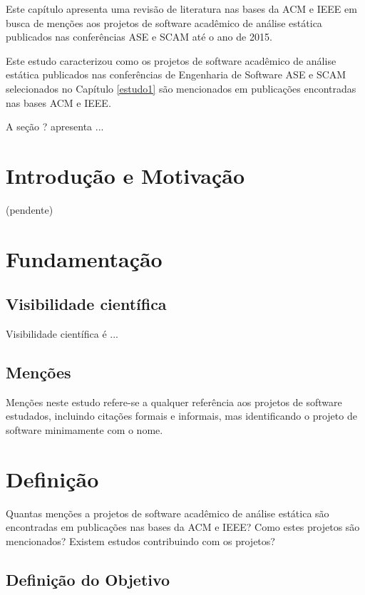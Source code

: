 {Este capítulo apresenta uma revisão de literatura nas bases da ACM e IEEE em
busca de menções aos projetos de software acadêmico de análise estática
publicados nas conferências ASE e SCAM até o ano de 2015.}

Este estudo caracterizou como os projetos de software acadêmico de análise
estática publicados nas conferências de Engenharia de Software ASE e SCAM
selecionados no Capítulo \ref{estudo1} são mencionados em publicações
encontradas nas bases ACM e IEEE.

A seção ? apresenta ...

\section{Introdução e Motivação}

(pendente)

\section{Fundamentação} \label{estudo2:fundamentacao} %

\subsection{Visibilidade científica}

Visibilidade científica é ...

\subsection{Menções}

Menções neste estudo refere-se a qualquer referência aos projetos de software
estudados, incluindo citações formais e informais, mas identificando o projeto
de software minimamente com o nome.


\section{Definição} \label{estudo2:definicao} %

Quantas menções a projetos de software acadêmico de análise estática são
encontradas em publicações nas bases da ACM e IEEE? Como estes projetos são
mencionados? Existem estudos contribuindo com os projetos?

\subsection{Definição do Objetivo}

